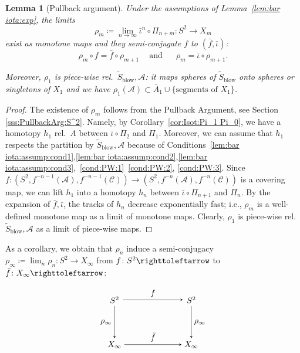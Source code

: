 \documentclass{amsart}
\theoremstyle{plain}
\newtheorem{lemma}[theorem]{Lemma}
\theoremstyle{definition}
\theoremstyle{remark}
\renewcommand{\AA}{{\mathcal A}}
\newcommand{\blowup}{{\operatorname{blow}}}
\renewcommand{\sp}{{\ \ }}
\newcommand{\CC}{{\mathcal C}}
\newcommand\selfmap{\righttoleftarrow}
\begin{document}
\begin{lemma}[Pullback argument]
\label{lem:PullBackArg} Under the assumptions of Lemma~\ref{lem:bar iota:exp}, the limits
\[ \rho_m\coloneq \lim_{n\to \infty} \bar\iota^n\circ \Pi_{n+m}\colon S^2\to X_m\]
exist as monotone maps and they semi-conjugate $f$ to $(\bar f, \bar \iota)$:
\[ \rho_m \circ f= \bar f\circ \rho_{m+1}\sp\sp\text{ and }\sp\sp \sp \rho_m=\bar \iota\circ \rho_{m+1}.\] 

Moreover, $\rho_1$ is piece-wise  rel.\ $\widetilde S_\blowup, \AA$: it maps spheres of $\widetilde S_\blowup$ onto spheres or singletons of $X_1$ and we have $\rho_1(\AA)\subset \bar A_1\cup \{\text{segments of $X_1$}\}$.
\end{lemma}


\begin{proof}
The existence of $\rho_m$ follows from the Pullback Argument, see Section \ref{sss:PullbackArg:S^2}. Namely, by Corollary~\ref{cor:Isot:Pi_1 Pi_0}, we have a homotopy $h_1$ rel.\ $A$ between $\bar\iota\circ \Pi_2$ and $\Pi_1$. Moreover, we can assume that $h_1$ respects the partition by $\widetilde S_\blowup, \AA$ because of Conditions~\ref{lem:bar iota:assump:cond1},\ref{lem:bar iota:assump:cond2},\ref{lem:bar iota:assump:cond3},~\ref{cond:PW:1}~\ref{cond:PW:2}, \ref{cond:PW:3}. Since $f\colon  (S^2,f^{-n-1}(\AA),f^{-n-1}(\CC))\to (S^2,f^{-n}(\AA),f^{-n}(\CC))$ is a covering map, we can lift $h_1$ into a homotopy $h_n$ between $\bar\iota\circ \Pi_{n+1}$ and $\Pi_n$. By the expansion of $\bar f, \bar \iota$, the tracks of $h_{n}$ decrease exponentially fast; i.e., $\rho_m$ is a well-defined monotone map as a limit of monotone maps. Clearly, $\rho_1$ is piece-wise rel.\ $\widetilde S_\blowup, \AA$ as a limit of piece-wise maps.
\end{proof}

As a corollary, we obtain that $\rho_n$ induce a semi-conjugacy $\rho_\infty\coloneq \lim_n \rho_n \colon S^2\to X_\infty$ from $f\colon S^2\selfmap$ to $\bar f\colon X_\infty\selfmap$:

\begin{equation}
\label{eq:dfn:cact map}
{\begin{tikzpicture}
  \matrix (m) [matrix of math nodes,row sep=4em,column sep=7em,minimum width=2em]
  {
     S^2 &S^2 \\
     X_\infty & X_\infty \\};
  \path[-stealth]
    (m-1-1) edge node [left] {$\rho_\infty $} (m-2-1)
            edge  node [above] {$f $} (m-1-2)
    (m-2-1.east|-m-2-2) edge node [above] {$\bar f$}
          (m-2-2)
    (m-1-2) edge node [right] {$\rho_\infty$} (m-2-2);
\end{tikzpicture}}
\end{equation}
\end{document}

